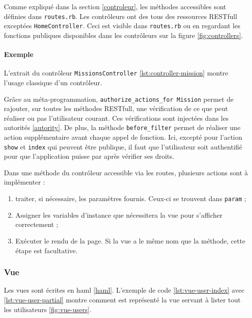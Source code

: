 Comme expliqué dans la section \ref{controleur}, les méthodes accessibles sont définies dans \texttt{routes.rb}. Les contrôleurs ont des tous des ressources RESTfull exceptées \texttt{HomeController}. Ceci est visible dans \texttt{routes.rb} ou en regardant les fonctions publiques disponibles dans les contrôleurs sur la figure \ref{fig:controllers}.

\paragraph{Exemple}
L'extrait du contrôleur \texttt{MissionsController} \ref{lst:controller-mission} montre l'usage classique d'un contrôleur. 


Grâce au méta-programmation, \lstinline[language=Rails]{authorize_actions_for Mission} permet de rajouter, sur toutes les méthodes RESTfull, une vérification de ce que peut réaliser ou pas l'utilisateur courant. Ces vérifications sont injectées dans les autorités \ref{autority}. De plus, la méthode \lstinline[language=Rails]{before_filter} permet de réaliser une action supplémentaire avant chaque appel de fonction. Ici, excepté pour l'action \texttt{show} et \texttt{index} qui peuvent être publique, il faut que l'utilisateur soit authentifié pour que l'application puisse par après vérifier ses droits. %

Dans une méthode du contrôleur accessible via les routes, plusieurs actions sont à implémenter :
\begin{enumerate}
  \item traiter, si nécessaire, les paramètres fournis. Ceux-ci se trouvent dans \lstinline[language=Rails]{param} ;
  \item Assigner les variables d'instance que nécessitera la vue pour s'afficher correctement ;
  \item Exécuter le rendu de la page. Si la vue a le même nom que la méthode, cette étape est facultative.
\end{enumerate}

\subsubsection{Vue}
\label{vues}
Les vues sont écrites en haml \ref{haml}. L'exemple de code \ref{lst:vue-user-index} avec \ref{lst:vue-user-partial} montre comment est représenté la vue servant à lister tout les utilisateurs \ref{fig:vue-users}.

